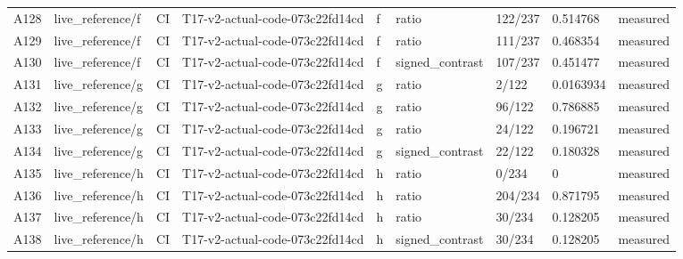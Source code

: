 \begin{longtable}{lllllllll}
A128 & live\_reference/f & CI & T17-v2-actual-code-073c22fd14cd & f & ratio & 122/237 & 0.514768 & measured \\
A129 & live\_reference/f & CI & T17-v2-actual-code-073c22fd14cd & f & ratio & 111/237 & 0.468354 & measured \\
A130 & live\_reference/f & CI & T17-v2-actual-code-073c22fd14cd & f & signed\_contrast & 107/237 & 0.451477 & measured \\
A131 & live\_reference/g & CI & T17-v2-actual-code-073c22fd14cd & g & ratio & 2/122 & 0.0163934 & measured \\
A132 & live\_reference/g & CI & T17-v2-actual-code-073c22fd14cd & g & ratio & 96/122 & 0.786885 & measured \\
A133 & live\_reference/g & CI & T17-v2-actual-code-073c22fd14cd & g & ratio & 24/122 & 0.196721 & measured \\
A134 & live\_reference/g & CI & T17-v2-actual-code-073c22fd14cd & g & signed\_contrast & 22/122 & 0.180328 & measured \\
A135 & live\_reference/h & CI & T17-v2-actual-code-073c22fd14cd & h & ratio & 0/234 & 0 & measured \\
A136 & live\_reference/h & CI & T17-v2-actual-code-073c22fd14cd & h & ratio & 204/234 & 0.871795 & measured \\
A137 & live\_reference/h & CI & T17-v2-actual-code-073c22fd14cd & h & ratio & 30/234 & 0.128205 & measured \\
A138 & live\_reference/h & CI & T17-v2-actual-code-073c22fd14cd & h & signed\_contrast & 30/234 & 0.128205 & measured \\
\hline\end{longtable}


